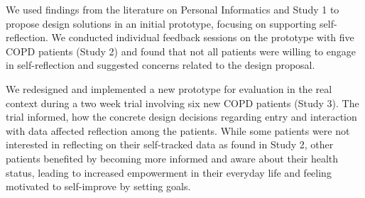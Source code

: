 We used findings from the literature on Personal Informatics and Study 1 to propose design solutions in an initial prototype, focusing on supporting self-reflection. We conducted individual feedback sessions on the prototype with five COPD patients (Study 2) and found that not all patients were willing to engage in self-reflection and suggested concerns related to the design proposal. 

We redesigned and implemented a new prototype for evaluation in the real context during a two week trial involving six new COPD patients (Study 3). The trial informed, how the concrete design decisions regarding entry and interaction with data affected reflection among the patients. While some patients were not interested in reflecting on their self-tracked data as found in Study 2, other patients benefited by becoming more informed and aware about their health status, leading to increased empowerment in their everyday life and feeling motivated to self-improve by setting goals. 
